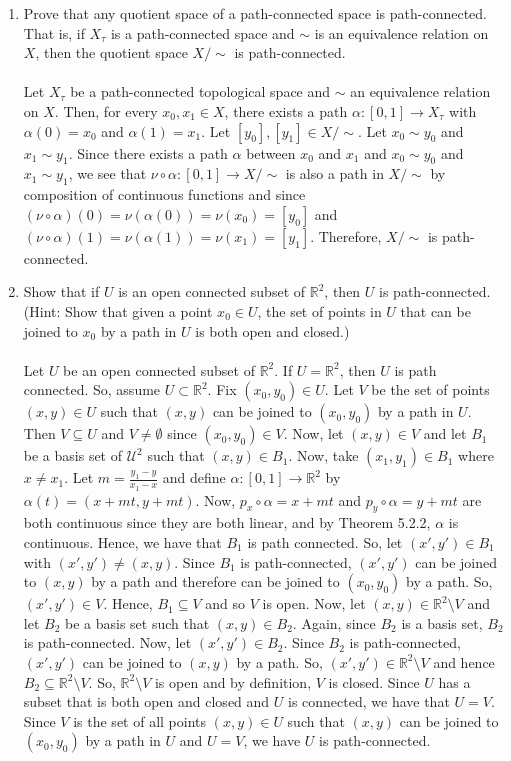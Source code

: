 \documentclass[12pt]{article}
\begin{document}
\begin{enumerate}
\item Prove that any quotient space of a path-connected space is path-connected. That is, if $X_{\tau}$ is a path-connected space and $\sim$ is an equivalence relation on $X$, then the quotient space $X/\sim$ is path-connected.\\\\
Let $X_{\tau}$ be a path-connected topological space and $\sim$ an equivalence relation on $X$. Then, for every $x_0,x_1\in X$, there exists a path $\alpha:[0,1]\rightarrow X_{\tau}$ with $\alpha(0)=x_0$ and $\alpha(1)=x_1$. Let $[y_0],[y_1]\in X/\sim$. Let $x_0\sim y_0$ and $x_1\sim y_1$. Since there exists a path $\alpha$ between $x_0$ and $x_1$ and $x_0\sim y_0$ and $x_1\sim y_1$, we see that $\nu\circ\alpha:[0,1]\rightarrow X/\sim$ is also a path in $X/\sim$ by composition of continuous functions and since $(\nu\circ\alpha)(0)=\nu(\alpha(0))=\nu(x_0)=[y_0]$ and $(\nu\circ\alpha)(1)=\nu(\alpha(1))=\nu(x_1)=[y_1]$. Therefore, $X/\sim$ is path-connected.\\

\item Show that if $U$ is an open connected subset of $\mathbb{R}^2$, then $U$ is path-connected. (Hint: Show that given a point $x_0\in U$, the set of points in $U$ that can be joined to $x_0$ by a path in $U$ is both open and closed.)\\\\

Let $U$ be an open connected subset of $\mathbb{R}^2$. If $U=\mathbb{R}^2$, then $U$ is path connected. So, assume $U\subset\mathbb{R}^2$. Fix $(x_0,y_0)\in U$. Let $V$ be the set of points $(x,y)\in U$ such that $(x,y)$ can be joined to $(x_0,y_0)$ by a path in $U$. Then $V\subseteq U$ and $V\neq\emptyset$ since $(x_0,y_0)\in V$. Now, let $(x,y)\in V$ and let $B_1$ be a basis set of $\mathcal{U}^2$ such that $(x,y)\in B_1$. Now, take $(x_1,y_1)\in B_1$ where $x\neq x_1$. Let $m=\frac{y_1-y}{x_1-x}$ and define $\alpha:[0,1]\rightarrow\mathbb{R}^2$ by $\alpha(t)=(x+mt,y+mt)$. Now, $p_x\circ\alpha=x+mt$ and $p_y\circ\alpha=y+mt$ are both continuous since they are both linear, and by Theorem 5.2.2, $\alpha$ is continuous. Hence, we have that $B_1$ is path connected. So, let $(x',y')\in B_1$ with $(x',y')\neq(x,y)$. Since $B_1$ is path-connected, $(x',y')$ can be joined to $(x,y)$ by a path and therefore can be joined to $(x_0,y_0)$ by a path. So, $(x',y')\in V$. Hence, $B_1\subseteq V$ and so $V$ is open. Now, let $(x,y)\in\mathbb{R}^2\setminus V$ and let $B_2$ be a basis set such that $(x,y)\in B_2$. Again, since $B_2$ is a basis set, $B_2$ is path-connected. Now, let $(x',y')\in B_2$. Since $B_2$ is path-connected, $(x',y')$ can be joined to $(x,y)$ by a path. So, $(x',y')\in\mathbb{R}^2\setminus V$ and hence $B_2\subseteq\mathbb{R}^2\setminus V$. So, $\mathbb{R}^2\setminus V$ is open and by definition, $V$ is closed. Since $U$ has a subset that is both open and closed and $U$ is connected, we have that $U=V$. Since $V$ is the set of all points $(x,y)\in U$ such that $(x,y)$ can be joined to $(x_0,y_0)$ by a path in $U$ and $U=V$, we have $U$ is path-connected.

\end{enumerate}
\end{document}

